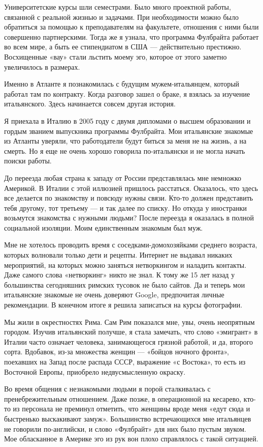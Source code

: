 Университетские курсы шли семестрами. Было много проектной работы, связанной с реальной жизнью и задачами. При необходимости можно было обратиться за помощью к преподавателям на факультете, отношения с ними были совершенно партнерскими. Тогда же я узнала, что программа Фулбрайта работает во всем мире, а быть ее стипендиатом в США — действительно престижно. Восхищенные «вау» стали льстить моему эго, которое от этого заметно увеличилось в размерах.

Именно в Атланте я познакомилась с будущим мужем-итальянцем, который работал там по контракту. Когда разговор зашел о браке, я взялась за изучение итальянского. Здесь начинается совсем другая история.

Я приехала в Италию в 2005 году с двумя дипломами о высшем образовании и гордым званием выпускника программы Фулбрайта. Мои итальянские знакомые из Атланты уверяли, что работодатели будут биться за меня не на жизнь, а на смерть. Но я еще не очень хорошо говорила по-итальянски и не могла начать поиски работы.

До переезда любая страна к западу от России представлялась мне немножко Америкой. В Италии с этой иллюзией пришлось расстаться. Оказалось, что здесь все делается по знакомству и повсюду нужны связи. Кто-то должен представить тебя другому, тот третьему — и так далее по списку. Но откуда у иностранки возьмутся знакомства с нужными людьми? После переезда я оказалась в полной социальной изоляции. Моим единственным знакомым был муж.

Мне не хотелось проводить время с соседками-домохозяйками среднего возраста, которых волновали только дети и рецепты. Интернет не выдавал никаких мероприятий, на которых можно заняться нетворкингом и наладить контакты. Даже самого слова «нетворкинг» никто не знал. К тому же 15 лет назад у большинства сегодняшних римских тусовок не было сайтов. Да и теперь мои итальянские знакомые не очень доверяют Google, предпочитая личные рекомендации. В конечном итоге я решила записаться на курсы фотографии.

Мы жили в окрестностях Рима. Сам Рим показался мне, увы, очень неопрятным городом. Изучив итальянский получше, я стала замечать, что слово «эмигрант» в Италии часто означает человека, занимающегося грязной работой, и да, второго сорта. Вдобавок, из-за множества женщин — «бойцов ночного фронта», поехавших на Запад после распада СССР, выражение «с Востока», то есть из Восточной Европы, приобрело недвусмысленную окраску.

Во время общения с незнакомыми людьми я порой сталкивалась с пренебрежительным отношением. Даже позже, в операционной на кесарево, кто-то из персонала не преминул отметить, что женщины вроде меня «едут сюда и быстренько выскакивают замуж». Большинство встречающихся мне итальянцев не говорили по-английски, и слово «Фулбрайт» для них было пустым звуком. Мое обласканное в Америке эго из рук вон плохо справлялось с такой ситуацией.


